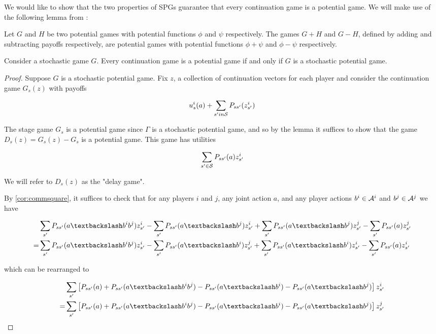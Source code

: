 We would like to show that the two properties of SPGs guarantee that every continuation game is a potential game. We will make use of the following lemma from \cite{monderer1996potential}:

\begin{lem}
Let $G$ and $H$ be two potential games with potential functions $\phi$ and $\psi$ respectively. The games $G + H$ and $G - H$, defined by adding and subtracting payoffs respectively, are potential games with potential functions $\phi + \psi$ and $\phi - \psi$ respectively.
\label{lem:sumpotential}
\end{lem}


\begin{thm}
Consider a stochastic game $G$. Every continuation game is a potential game if and only if $G$ is a stochastic potential game.

\begin{proof}

Suppose $G$ is a stochastic potential game. Fix $z$, a collection of continuation vectors for each player and consider the continuation game $G_s(z)$ with payoffs

$$
u^i_s(a) + \sum_{s' in \SS} P_{ss'}(z^i_{s'})
$$

The stage game $G_s$ is a potential game since $\Gamma$ is a stochastic potential game, and so by the lemma it suffices to show that the game $D_s(z) = G_s(z) - G_s$ is a potential game. This game has utilities

$$
\sum_{s' \in \SS} P_{ss'}(a)z^i_{s'}
$$

We will refer to $D_s(z)$ as the "delay game".

By \ref{cor:commsquare}, it suffices to check that for any players $i$ and $j$, any joint action $a$, and any player actions $b^i \in \AA^i$ and $b^j \in \AA^j$ we have

\begin{align*}
&\sum_{s'} P_{ss'}(\asub{a}{b^ib^j})z^i_{s'} - \sum_{s'} P_{ss'}(\asub{a}{b^j})z^i_{s'} + \sum_{s'} P_{ss'}(\asub{a}{b^j})z^j_{s'} - \sum_{s'} P_{ss'}(a)z^j_{s'} \\
= &\sum_{s'} P_{ss'}(\asub{a}{b^ib^j})z^i_{s'} - \sum_{s'} P_{ss'}(\asub{a}{b^i})z^j_{s'} + \sum_{s'} P_{ss'}(\asub{a}{b^i})z^i_{s'} - \sum_{s'} P_{ss'}(a)z^i_{s'} 
\end{align*}

which can be rearranged to

\begin{align}
&\sum_{s'} \left[P_{ss'}(a) + P_{ss'}(\asub{a}{b^ib^j}) - P_{ss'}(\asub{a}{b^i}) - P_{ss'}(\asub{a}{b^j}) \right] z^i_{s'} \nonumber \\
= &\sum_{s'} \left[P_{ss'}(a) + P_{ss'}(\asub{a}{b^ib^j}) - P_{ss'}(\asub{a}{b^i}) - P_{ss'}(\asub{a}{b^j}) \right] z^j_{s'} \label{eq:continuation}
\end{align}


\end{proof}
\end{thm}
